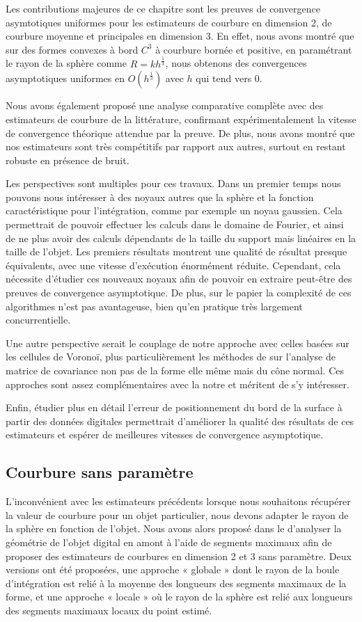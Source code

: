 Les contributions majeures de ce chapitre sont les preuves de convergence
asymtotiques uniformes pour les estimateurs de courbure en dimension 2, de
courbure moyenne et principales en dimension 3. En effet, nous avons montré que
sur des formes convexes à bord $C^3$ à courbure bornée et positive, en
paramétrant le rayon de la sphère comme $R = kh^\frac{1}{3}$, nous obtenons des
convergences asymptotiques uniformes en $O(h^\frac{1}{3})$ avec $h$ qui tend
vers $0$.

Nous avons également proposé une analyse comparative complète avec des
estimateurs de courbure de la littérature, confirmant expérimentalement la
vitesse de convergence théorique attendue par la preuve. De plus, nous avons
montré que nos estimateurs sont très compétitifs par rapport aux autres, surtout
en restant robuste en présence de bruit.


Les perspectives sont multiples pour ces travaux. Dans un premier temps nous
pouvons nous intéresser à des noyaux autres que la sphère et la fonction
caractéristique pour l'intégration, comme par exemple un noyau gaussien. Cela
permettrait de pouvoir effectuer les calculs dans le domaine de Fourier, et
ainsi de ne plus avoir des calculs dépendants de la taille du support mais
linéaires en la taille de l'objet. Les premiers résultats montrent une qualité
de résultat presque équivalents, avec une vitesse d'exécution énormément
réduite. Cependant, cela nécessite d'étudier ces nouveaux noyaux afin de pouvoir
en extraire peut-être des preuves de convergence asymptotique. De plus, sur le
papier la complexité de ces algorithmes n'est pas avantageuse, bien qu'en
pratique très largement concurrentielle.


Une autre perspective serait le couplage de notre approche avec celles basées
sur les cellules de Voronoï, plus particulièrement les méthodes de \VCMM
\cite{Merigot2009,Merigot2011,Cuel2014} sur l'analyse de matrice de covariance
non pas de la forme elle même mais du cône normal. Ces approches sont
assez complémentaires avec la notre et méritent de s'y intéresser.


Enfin, étudier plus en détail l'erreur de positionnement du bord de la surface à
partir des données digitales permettrait d'améliorer la qualité des résultats de
ces estimateurs et espérer de meilleures vitesses de convergence asymptotique.
%
\subsection*{Courbure sans paramètre}
%
L'inconvénient avec les estimateurs précédents lorsque nous souhaitons récupérer
la valeur de courbure pour un objet particulier, nous devons adapter le rayon de
la sphère en fonction de l'objet. Nous avons alors proposé dans le
 d'analyser la géométrie de l'objet digital en amont à
l'aide de segments maximaux afin de proposer des estimateurs de courbures en
dimension 2 et 3 sans paramètre. Deux versions ont été proposées, une approche «
globale » dont le rayon de la boule d'intégration est relié à la moyenne des
longueurs des segments maximaux de la forme, et une approche « locale » où le
rayon de la sphère est relié aux longueurs des segments maximaux locaux du point
estimé.

